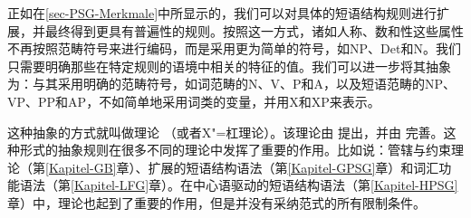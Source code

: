 正如在\ref{sec-PSG-Merkmale}中所显示的，我们可以对具体的短语结构规则进行扩展，并最终得到更具有普遍性的规则。按照这一方式，诸如人称、数和性这些属性不再按照范畴符号来进行编码，而是采用更为简单的符号，如NP、Det和N。我们只需要明确那些在特定规则的语境中相关的特征的值。我们可以进一步将其抽象为：与其采用明确的范畴符号，如词范畴的N、V、P和A，以及短语范畴的NP、VP、PP和AP，不如简单地采用词类的变量，并用X和XP来表示。

这种抽象的方式就叫做\xbarc 理论 （或者X"=杠理论）。该理论由 \citet{Chomsky70a}提出，并由 \citet{Jackendoff77a}完善。这种形式的抽象规则在很多不同的理论中发挥了重要的作用。比如说：管辖与约束理论（第\ref{Kapitel-GB}章）、扩展的短语结构语法（第\ref{Kapitel-GPSG}章）和词汇功能语法（第\ref{Kapitel-LFG}章）。在中心语驱动的短语结构语法（第\ref{Kapitel-HPSG}章）中，\xbarc 理论也起到了重要的作用，但是并没有采纳\xbarc 范式的所有限制条件。

